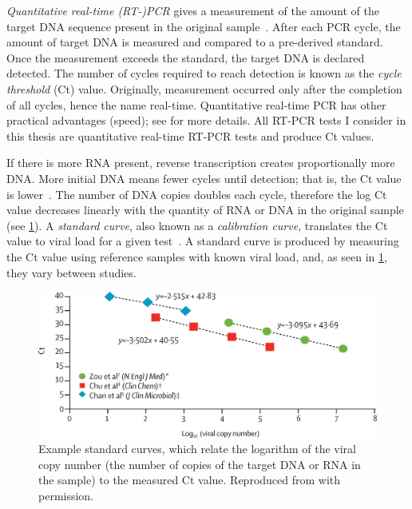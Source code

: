 \documentclass[thesis.tex]{subfiles}
\begin{document}
\emph{Quantitative real-time (RT-)PCR} gives a measurement of the amount of the target DNA sequence present in the original sample~\autocite{yangPCRdiagnostics}.
After each PCR cycle, the amount of target DNA is measured and compared to a pre-derived standard.
Once the measurement exceeds the standard, the target DNA is declared detected. 
The number of cycles required to reach detection is known as the \emph{cycle threshold} (Ct) value.
Originally, measurement occurred only after the completion of all cycles, hence the name real-time.
Quantitative real-time PCR has other practical advantages (\eg speed); see \textcite{yangPCRdiagnostics,valasekPower} for more details.
All RT-PCR tests I consider in this thesis are quantitative real-time RT-PCR tests and produce Ct values.

If there is more RNA present, reverse transcription creates proportionally more DNA.
More initial DNA means fewer cycles until detection; that is, the Ct value is lower~\autocite{hanRTPCR}.
The number of DNA copies doubles each cycle, therefore the log Ct value decreases linearly with the quantity of RNA or DNA in the original sample (see \cref{biology-data:fig:ct-calibration}).
A \emph{standard curve}, also known as a \emph{calibration curve}, translates the Ct value to viral load for a given test~\autocite{bustinMIQE}.
A standard curve is produced by measuring the Ct value using reference samples with known viral load, and, as seen in \cref{biology-data:fig:ct-calibration}, they vary between studies.
\begin{figure}
    \centering
    \includegraphics[width=\textwidth]{biology-data/ct-calibration}
    \caption[Example standard Ct curves]{%
        Example standard curves, which relate the logarithm of the viral copy number (the number of copies of the target DNA or RNA in the sample) to the measured Ct value.
        Reproduced from \textcite{hanRTPCR} with permission.
    }
    \label{biology-data:fig:ct-calibration}
\end{figure}
\end{document}
